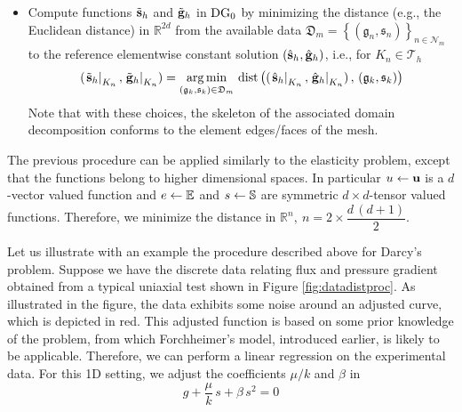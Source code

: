\begin{itemize}
 \item[3.] Compute functions $\tilde{\mathbf{s}}_h$ and $\tilde{\mathbf{g}}_h$ in $\text{DG}_0$
 by minimizing the distance (e.g., the Euclidean distance)
 in $\mathbb{R}^{2d}$ from the available data
 $\mathfrak{D}_m =\left\lbrace\left(\mathfrak{g}_n,\mathfrak{s}_n\right)\right\rbrace_{n \in \mathcal{N}_m}$
 to the reference elementwise constant solution $(\hat{\mathbf{s}}_h, \hat{\mathbf{g}}_h)$, i.e., for $K_n \in \mathcal{T}_h$
 \begin{equation*}
 (\left. \tilde{\mathbf{s}}_h\right |_{K_n}, \left. \tilde{\mathbf{g}}_h\right |_{K_n}) =
 \operatorname*{arg\,min}_{\left(\mathfrak{g}_k,\mathfrak{s}_k\right) \in \mathfrak{D}_m} \, \text{dist} \left ( (\left. \hat{\mathbf{s}}_h\right |_{K_n}, \left. \hat{\mathbf{g}}_h\right |_{K_n}) \, , \, \left(\mathfrak{g}_k,\mathfrak{s}_k\right) \right )
\end{equation*}
Note that with these choices, the skeleton of the associated 
domain decomposition conforms to the element edges/faces of the mesh.
\end{itemize}
\begin{remark}
The previous procedure can be applied similarly to the elasticity problem, 
except that the functions belong to higher dimensional spaces. 
In particular $u \leftarrow \mathbf{u}$ is a $d$-vector valued function and
$e \leftarrow \mathbb{E}$ and $s \leftarrow \mathbb{S}$ are symmetric
$d\times d$-tensor valued functions. 
Therefore, we minimize the distance in $\mathbb{R}^{n},~n = 2 \times \dfrac{d\,(d+1)}{2}$.
\end{remark}
Let us illustrate with an example the procedure described above for Darcy's problem.
Suppose we have the discrete data relating flux and pressure gradient
obtained from a typical uniaxial test shown in Figure \ref{fig:datadistproc}.
As illustrated in the figure, the data exhibits some noise around
an adjusted curve, which is depicted in red. This adjusted function is
based on some prior knowledge of the problem, from which Forchheimer's model,
introduced earlier, is likely to be applicable. Therefore, we can perform a linear
regression on the experimental data. For this 1D setting, we adjust the coefficients 
$\mu/k$ and $\beta$ in
\begin{equation}
g + \dfrac{\mu}{k}\,s + \beta \,s^2 = 0 \label{eq:forchscalar}
\end{equation}
